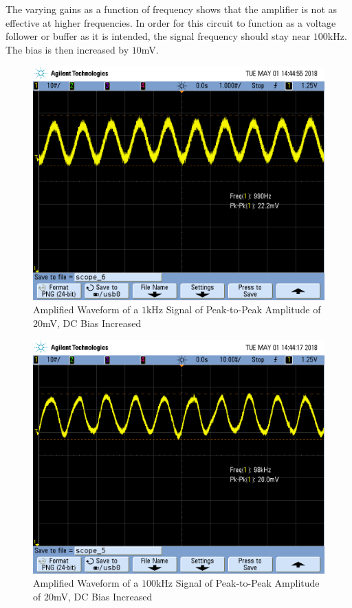 \FloatBarrier

The varying gains as a function of frequency shows that the amplifier is not as effective at higher frequencies. In order for this circuit to function as a voltage follower or buffer as it is intended, the signal frequency should stay near $100$\si{\kilo\hertz}.
The bias is then increased by $10$\si{\milli\volt}.

\FloatBarrier

\begin{figure}[h!]
	\centering
	\includegraphics[scale=0.45]{./images/SCOPE_6.PNG}
	\caption{Amplified Waveform of a $1$\si{\kilo\hertz} Signal of Peak-to-Peak Amplitude of $20$\si{\milli\volt}, DC Bias Increased}
	\label{fig:SCOPE_6}
\end{figure}

\FloatBarrier

\begin{figure}[h!]
	\centering
	\includegraphics[scale=0.45]{./images/SCOPE_5.PNG}
	\caption{Amplified Waveform of a $100$\si{\kilo\hertz} Signal of Peak-to-Peak Amplitude of $20$\si{\milli\volt}, DC Bias Increased}
	\label{fig:SCOPE_5}
\end{figure}

